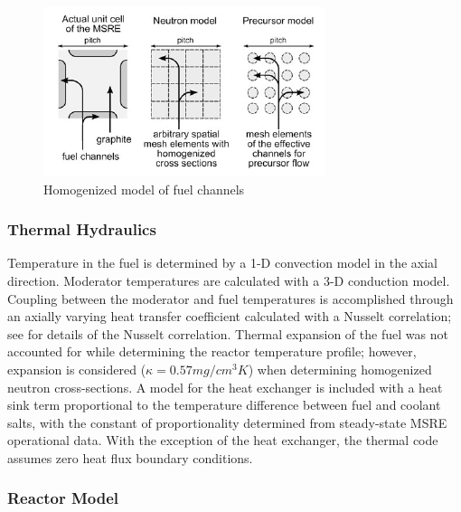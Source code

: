 \documentclass{article}
\let\Oldsubsubsection\subsubsection
\renewcommand{\subsubsection}{\FloatBarrier\Oldsubsubsection}
\begin{document}
\begin{figure}[htpb]
  \centering
  \includegraphics[max height=.5\textheight,max width=\textwidth,keepaspectratio]{kophazi_neutronics_discretization.png}
  \caption{Homogenized model of fuel channels \cite{kophazi_development_2009}}
  \label{fig:kophazi_homo}
\end{figure}

\subsubsection{Thermal Hydraulics}

Temperature in the fuel is determined by a 1-D convection model in the axial
direction. Moderator temperatures are calculated with a 3-D conduction
model. Coupling between the moderator and fuel temperatures is accomplished
through an axially varying heat transfer coefficient calculated with a Nusselt
correlation; see \cite{kophazi_development_2009} for details of the Nusselt
correlation. Thermal expansion of the fuel was not accounted for while
determining the reactor temperature profile; however, expansion is considered
($\kappa = 0.57 mg/cm^3 K$) when determining homogenized neutron
cross-sections. A model for the heat exchanger is included with a heat sink term
proportional to the temperature difference between fuel and coolant salts, with
the constant of proportionality determined from steady-state \gls{MSRE} operational
data. With the exception of the heat exchanger, the thermal code assumes zero
heat flux boundary conditions.

\subsubsection{Reactor Model}
\end{document}
